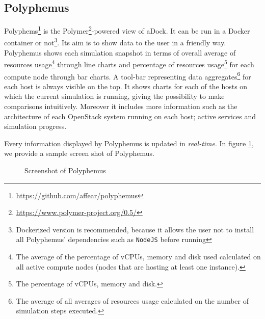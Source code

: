 \subsection{Polyphemus}
\label{sub:polyphemus}
Polyphems\footnote{\url{https://github.com/affear/polyphemus}} is the Polymer\footnote{\url{https://www.polymer-project.org/0.5/}}-powered view of aDock. It can be run in a Docker container or not\footnote{Dockerized version is recommended, because it allows the user not to install all Polyphemus' dependencies such as \texttt{NodeJS} before running}. Its aim is to show data to the user in a friendly way. Polyphemus shows each simulation snapshot in terms of overall average of resources usage\footnote{The average of the percentage of vCPUs, memory and disk used calculated on all active compute nodes (nodes that are hosting at least one instance).} through line charts and percentage of resources usage\footnote{The percentage of vCPUs, memory and disk.} for each compute node through bar charts. A tool-bar representing data aggregates\footnote{The average of all averages of resources usage calculated on the number of simulation steps executed.} for each host is always visible on the top. It shows charts for each of the hosts on which the current simulation is running, giving the possibility to make comparisons intuitively. Moreover it includes more information such as the architecture of each OpenStack system running on each host; active services and simulation progress.

Every information displayed by Polyphemus is updated in \textit{real-time}. In figure \ref{fig:poly}, we provide a sample screen shot of Polyphemus. 

\begin{figure}[H]
\label{fig:poly}
\caption{Screenshot of Polyphemus}
\end{figure}

